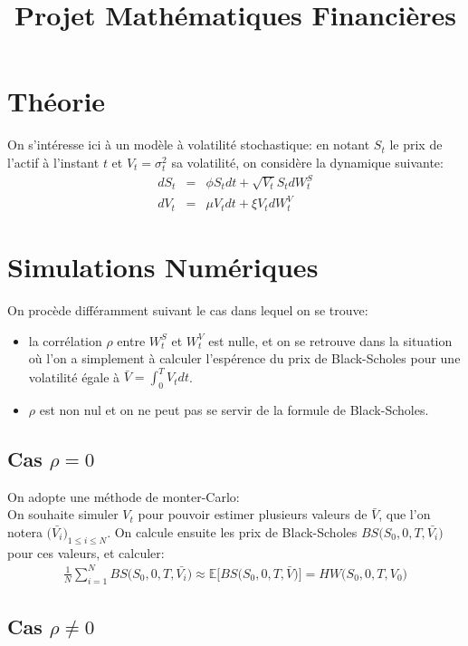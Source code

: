 \documentclass{report}
\title{Projet Mathématiques Financières}
\begin{document}
\section*{Théorie}
On s'intéresse ici à un modèle à volatilité stochastique: en notant $S_t$ le prix de l'actif à l'instant $t$ et $V_t = \sigma_t^2$ sa volatilité, on considère la dynamique suivante:
\begin{eqnarray*}
dS_t &=& \phi S_t dt + \sqrt{V_t} S_t dW_t^S\\
dV_t &=& \mu V_t dt + \xi V_t dW_t^V
\end{eqnarray*}

\section*{Simulations Numériques}
On procède différamment suivant le cas dans lequel on se trouve:
\begin{itemize}
	\item la corrélation $\rho$ entre $W_t^S$ et $W_t^V$ est nulle, et on se retrouve dans la situation où l'on a simplement à calculer l'espérence du prix de Black-Scholes pour une volatilité égale à $\bar{V} = \int_0^T{V_t dt}$.
	\item $\rho$ est non nul et on ne peut pas se servir de la formule de Black-Scholes.
\end{itemize}
\subsection*{Cas $\rho=0$}
On adopte une méthode de monter-Carlo:\\
On souhaite simuler $V_t$ pour pouvoir estimer plusieurs valeurs de $\bar{V}$, que l'on notera $\big(\bar{V_i}\big)_{1\leq i\leq N}$. On calcule ensuite les prix de Black-Scholes $BS\big(S_0, 0, T, \bar{V_i}\big)$ pour ces valeurs, et calculer:
\begin{eqnarray*}
\frac{1}{N}\sum\limits_{i=1}^N{BS\big(S_0, 0, T, \bar{V_i}\big)} \approx \mathbb{E}\Big[BS\big(S_0, 0, T, \bar{V}\big)\Big] = HW\big(S_0, 0, T, V_0\big)
\end{eqnarray*}
\subsection*{Cas $\rho \neq 0$}
\end{document}
